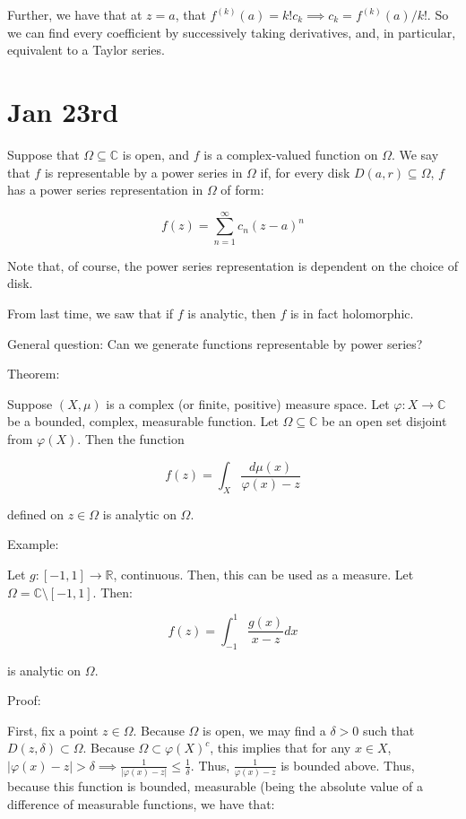 \documentclass[10pt]{article}
\begin{document}
Further, we have that at $z = a$, that $f^{(k)}(a) = k! c_k \implies c_k = f^{(k)}(a)/k!$. So we can find every coefficient by successively taking derivatives, and, in particular, equivalent to a Taylor series.

\section*{Jan 23rd}

Suppose that $\Omega \subseteq \mathbb{C}$ is open, and $f$ is a complex-valued function on $\Omega$. We say that $f$ is representable by a power series in $\Omega$ if, for every disk $D(a,r) \subseteq \Omega$, $f$ has a power series representation in $\Omega$ of form:

$$ f(z) = \sum_{n=1}^\infty c_n (z - a)^n $$

Note that, of course, the power series representation is dependent on the choice of disk.

From last time, we saw that if $f$ is analytic, then $f$ is in fact holomorphic.

General question: Can we generate functions representable by power series?

Theorem:

Suppose $(X,\mu)$ is a complex (or finite, positive) measure space. Let $\varphi: X \to \mathbb{C}$ be a bounded, complex, measurable function. Let $\Omega \subseteq \mathbb{C}$ be an open set disjoint from $\varphi(X)$. Then the function

$$f(z) = \int_X \frac{d\mu(x)}{\varphi(x) - z} $$

defined on $z \in \Omega$ is analytic on $\Omega$.

Example:

Let $g: [-1,1] \to \mathbb{R}$, continuous. Then, this can be used as a measure. Let $\Omega = \mathbb{C} \setminus [-1,1]$. Then:

$$ f(z) = \int_{-1}^1 \frac{ g(x)}{x - z} dx $$

is analytic on $\Omega$.

Proof:


First, fix a point $z \in \Omega$. Because $\Omega$ is open, we may find a $\delta > 0$ such that $D(z,\delta) \subset \Omega$. Because $\Omega \subset \varphi(X)^c$, this implies that for any $x \in X$, $| \varphi(x) - z| > \delta \implies \frac{1}{| \varphi(x) - z|}  \leq \frac{1}{\delta}$. Thus, $\frac{1}{ \varphi(x) - z} $ is bounded above. Thus, because this function is bounded, measurable (being the absolute value of a difference of measurable functions, we have that:
\end{document}
